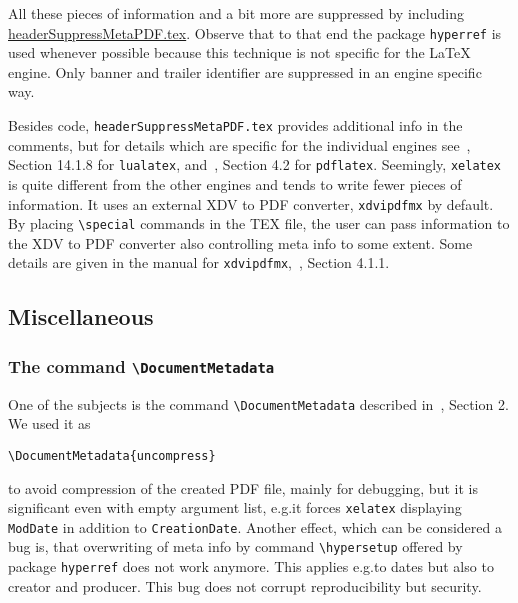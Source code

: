 \documentclass[a4paper, english]{article}%
\newcommand{\pdflatex}{\texttt{pdflatex}}
\newcommand{\lualatex}{\texttt{lualatex}}
\newcommand{\xelatex}{\texttt{xelatex}}
\newcommand{\cmd}[1]{\texttt{\textbackslash#1}}
\begin{document}
\begin{description}
\end{description}

All these pieces of information 
and a bit more are suppressed 
by including \href{\urlSite fromTex/headerSuppressMetaPDF.tex}{headerSuppressMetaPDF.tex}. 
Observe that to that end the package \texttt{hyperref} is used 
whenever possible because this technique is not specific for the \LaTeX{} engine. 
Only banner and trailer identifier are suppressed in an engine specific way. 

Besides code, \texttt{headerSuppressMetaPDF.tex} provides 
additional info in the comments, 
but for details which are specific for the individual engines 
see~\cite{LuaTexRef24}, Section 14.1.8 for \lualatex, 
and~\cite{PdfTexUsr24}, Section 4.2 for \pdflatex. 
Seemingly, \xelatex{} is quite different from the other engines 
and tends to write fewer pieces of information. 
It uses an external XDV to PDF converter, \texttt{xdvipdfmx} by default. 
By placing \cmd{special} commands in the TEX file, 
the user can pass information to the XDV to PDF converter 
also controlling meta info to some extent. 
Some details are given in the 
manual for \texttt{xdvipdfmx},~\cite{DviPdfMx}, Section 4.1.1. 



\subsection{Miscellaneous}\label{subsec:misc}

\subsubsection{The command \cmd{DocumentMetadata}}\label{subsubsec:docMeta}

One of the subjects is the command \cmd{DocumentMetadata} 
described in~\cite{DocMetaDataSuppCode}, Section 2. 
We used it as 
%
\begin{verbatim}
\DocumentMetadata{uncompress}
\end{verbatim}
%
to avoid compression of the created PDF file, mainly for debugging, 
but it is significant even with empty argument list, 
e.g.\@ it forces \xelatex{} displaying \texttt{ModDate} in addition to \texttt{CreationDate}. 
Another effect, which can be considered a bug is, 
that overwriting of meta info by command \cmd{hypersetup} offered by package \texttt{hyperref} 
does not work anymore. 
This applies e.g.\@ to dates but also to creator and producer. 
This bug does not corrupt reproducibility but security. 
\end{document}

